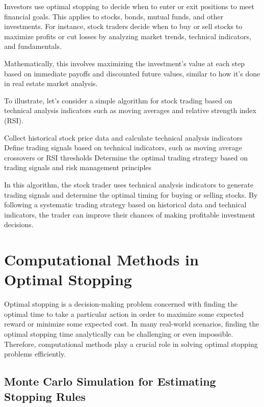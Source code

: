 \documentclass[12pt]{book} %
\begin{document}
Investors use optimal stopping to decide when to enter or exit positions to meet financial goals. This applies to stocks, bonds, mutual funds, and other investments. For instance, stock traders decide when to buy or sell stocks to maximize profits or cut losses by analyzing market trends, technical indicators, and fundamentals.

Mathematically, this involves maximizing the investment's value at each step based on immediate payoffs and discounted future values, similar to how it's done in real estate market analysis.

To illustrate, let's consider a simple algorithm for stock trading based on technical analysis indicators such as moving averages and relative strength index (RSI).
\FloatBarrier
\begin{algorithm}
\caption{Optimal Stock Trading Strategy}
\begin{algorithmic}[1]
\State Collect historical stock price data and calculate technical analysis indicators
\State Define trading signals based on technical indicators, such as moving average crossovers or RSI thresholds
\State Determine the optimal trading strategy based on trading signals and risk management principles
\end{algorithmic}
\end{algorithm}
\FloatBarrier
In this algorithm, the stock trader uses technical analysis indicators to generate trading signals and determine the optimal timing for buying or selling stocks. By following a systematic trading strategy based on historical data and technical indicators, the trader can improve their chances of making profitable investment decisions.


\section{Computational Methods in Optimal Stopping}

Optimal stopping is a decision-making problem concerned with finding the optimal time to take a particular action in order to maximize some expected reward or minimize some expected cost. In many real-world scenarios, finding the optimal stopping time analytically can be challenging or even impossible. Therefore, computational methods play a crucial role in solving optimal stopping problems efficiently.

\subsection{Monte Carlo Simulation for Estimating Stopping Rules}
\end{document}

